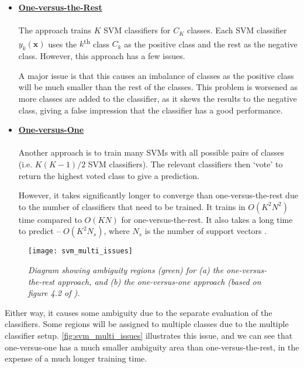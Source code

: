 \begin{itemize}
  \item \textbf{\underline{One-versus-the-Rest}} \\ \\
    The approach trains $K$ SVM classifiers for $C_K$ classes. Each SVM classifier $y_k(\mathbf{x})$ uses the $k$\textsuperscript{th} class $C_k$ as the positive class and the rest as the negative class. However, this approach has a few issues. 

A major issue is that this causes an imbalance of classes as the positive class will be much smaller than the rest of the classes. This problem is worsened as more classes are added to the classifier, as it skews the results to the negative class, giving a false impression that the classifier has a good performance.
\\

  \item \textbf{\underline{One-versus-One}} \\ \\
Another approach is to train many SVMs with all possible pairs of classes (i.e. $K(K-1)/2$ SVM classifiers). The relevant classifiers then `vote' to return the highest voted class to give a prediction.

However, it takes significantly longer to converge than one-versus-the-rest due to the number of classifiers that need to be trained. It trains in $O(K^2N^2)$ time compared to $O(KN)$ for one-versus-the-rest. It also takes a long time to predict -- $O(K^2N_{s})$, where $N_s$ is the number of support vectors \cite{mur-book}. 

\end{itemize}

\begin{figure}[H]
  \centering
  \texttt{[image: svm\_multi\_issues]}
  \caption{\textit{Diagram showing ambiguity regions (green) for (a) the one-versus-the-rest approach, and (b) the one-versus-one approach (based on figure 4.2 of \protect{}).}}
  \label{fig:svm_multi_issues}
\end{figure}

Either way, it causes some ambiguity due to the separate evaluation of the classifiers. Some regions will be assigned to multiple classes due to the multiple classifier setup. \autoref{fig:svm_multi_issues} illustrates this issue, and we can see that one-versus-one has a much smaller ambiguity area than one-versus-the-rest, in the expense of a much longer training time.


